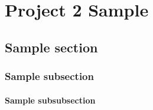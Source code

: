\chapter[Project 2 Sample]{Project 2 Sample}\label{chap-sample-2}

\section{Sample section}

\subsection{Sample subsection}

\subsubsection{Sample subsubsection}